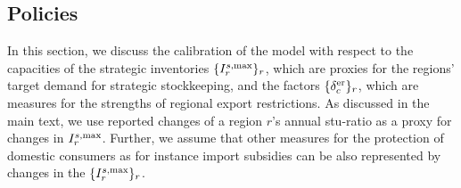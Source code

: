 

\subsection{Policies}
\label{si:trad_pol}
In this section, we discuss the calibration of the model with respect to the capacities of the
strategic inventories $\lbrace I^{s,\operatorname{max}}_r\rbrace_r$, which are proxies for the regions' target demand
for strategic stockkeeping, and the factors $\lbrace\delta^{\operatorname{er}}_c\rbrace_r$, which are measures for the
strengths of regional export restrictions. As discussed in the main text, we use reported changes of
a region $r$'s annual stu-ratio as a proxy for changes in $I^{s,\operatorname{max}}_r$.  Further, we assume that other
measures for the protection of domestic consumers as for instance import subsidies can be also
represented by changes in the $\lbrace I^{s,\operatorname{max}}_r \rbrace_r$.

